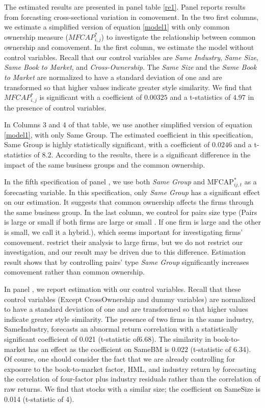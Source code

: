 	
The estimated results are presented in panel table \ref{re1}. Panel  reports results from forcasting cross-sectional variation in comovement.
In the two first columns, we estimate a simplified version of equation \ref{model1} with only common ownership measure ($ MFCAP^*_{i,j}$) to investigate the relationship between common ownership and comovement. In the first column, we estimate the model without control variables. Recall that our control variables are \textit{Same Industry}, \textit{Same Size}, \textit{Same Book to Market}, and \textit{Cross-Ownership}. The \textit{Same Size} and the \textit{Same Book to Market} are normalized to have a standard deviation of one and are transformed so that higher values indicate greater style similarity. We find that $ MFCAP^*_{i,j}$ is significant with a coefficient of $0.00325$ and a t-statistics of $4.97$ in the presence of control variables. 
		
		
		In Columns 3 and 4 of that table, we use another simplified version of equation \ref{model1}, with only Same Group. The estimated coefficient in this specification, Same Group is highly statistically significant, with a coefficient of   $0.0246$ and a t-statistics of $8.2$. According to the results, there is a significant difference in the impact of the same business groups and the common ownership. 
		
		In the fifth specification of panel , we use both \textit{Same Group}  and $\text{MFCAP}^*_{ij,t}$ as a forecasting variable. In this specification, only  \textit{Same Group} has a significant effect on our estimation. It suggests that common ownership affects the firms through the same business group. In the last column, we control for pairs size type (Pairs is large or small if both firms are large or small . If one firm is large and the other is small, we call it a hybrid.), which seems important for investigating firms' comovement.	\cite{AntonPolk} restrict their analysis to large firms, but we do not restrict our investigation, and our result may be driven due to this difference. Estimation result shows that by controlling pairs' type \textit{Same Group} significantly increases comovement rather than common ownership.
	
	In panel , we report estimation with our control variables. Recall that these control variables (Except CrossOwnership and dummy variables) are normalized to have a standard deviation of one and are transformed so that higher values indicate greater style similarity. The presence of two firms in the same industry, SameIndustry, forecasts an abnormal return correlation with a statistically significant coefficient of 0.021 (t-statistic of6.68). The similarity in book-to-market has an effect as the coefficient on SameBM is 0.022 (t-statistic of 6.34). Of course, one should consider the fact that we are already controlling for exposure to the book-to-market factor, HML, and industry return by forecasting the correlation of four-factor plus industry residuals rather than the correlation of raw returns. We find that stocks with a similar size; the coefficient on SameSize is 0.014 (t-statistic of 4). 
	
